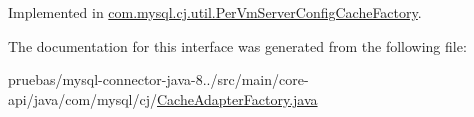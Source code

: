Implemented in \mbox{\hyperlink{classcom_1_1mysql_1_1cj_1_1util_1_1_per_vm_server_config_cache_factory_a3d72d677ff8a942061bf2d6f8695c88d}{com.\+mysql.\+cj.\+util.\+Per\+Vm\+Server\+Config\+Cache\+Factory}}.



The documentation for this interface was generated from the following file\+:\begin{DoxyCompactItemize}
\item 
pruebas/mysql-\/connector-\/java-\/8../src/main/core-\/api/java/com/mysql/cj/\mbox{\hyperlink{_cache_adapter_factory_8java}{Cache\+Adapter\+Factory.\+java}}\end{DoxyCompactItemize}
